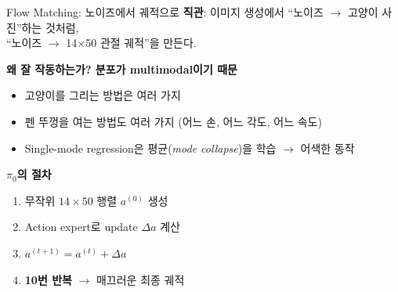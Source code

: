 \documentclass[aspectratio=169,10pt]{beamer}
\begin{document}
\begin{frame}{Flow Matching: 노이즈에서 궤적으로}
\textbf{직관}: 이미지 생성에서 ``노이즈 $\to$ 고양이 사진''하는 것처럼,\\
``노이즈 $\to$ 14$\times$50 관절 궤적''을 만든다.

\vspace{0.6em}
\textbf{왜 잘 작동하는가? 분포가 \alert{multimodal}이기 때문}
\begin{itemize}
  \item 고양이를 그리는 방법은 여러 가지
  \item 펜 뚜껑을 여는 방법도 여러 가지 (어느 손, 어느 각도, 어느 속도)
  \item Single-mode regression은 평균(\textit{mode collapse})을 학습 $\to$ 어색한 동작
\end{itemize}

\vspace{0.6em}
\textbf{$\pi_0$의 절차}
\begin{enumerate}
  \item 무작위 $14\times50$ 행렬 $a^{(0)}$ 생성
  \item Action expert로 update $\Delta a$ 계산
  \item $a^{(t+1)} = a^{(t)} + \Delta a$
  \item \textbf{10번 반복} $\to$ 매끄러운 최종 궤적
\end{enumerate}
\end{frame}
\end{document}
